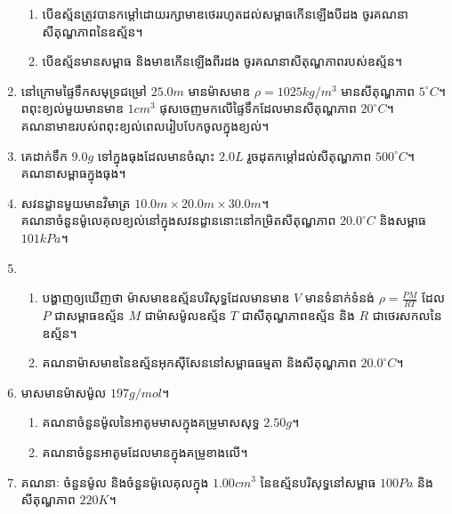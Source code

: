 \begin{enumerate}
	\begin{enumerate}[k]
		\item បើឧស្ម័នត្រូវបានកម្តៅដោយរក្សាមាឌថេររហូតដល់សម្ពាធកើនឡើងបីដង ចូរគណនាសីតុណ្ហភាពនៃឧស្ម័ន។
		\item បើឧស្ម័នមានសម្ពាធ និងមាឌកើនឡើងពីរដង ចូរគណនាសីតុណ្ហភាពរបស់ឧស្ម័ន។
	\end{enumerate}
	\item នៅក្រោមផ្ទៃទឹកសមុទ្រជម្រៅ $25.0m$ មានម៉ាសមាឌ $\rho=1025kg/m^{3}$ មានសីតុណ្ហភាព $5^\circ C$។ ពពុះខ្យល់មួយមានមាឌ $1cm^{3}$ ផុសចេញមកលើផ្ទៃទឹកដែលមានសីតុណ្ហភាព $20^\circ C$។\\ គណនាមាឌរបស់ពពុះខ្យល់ពេលរៀបបែកចូលក្នុងខ្យល់។
	\item គេដាក់ទឹក $9.0g$ ទៅក្នុងធុងដែលមានចំណុះ $2.0L$ រួចដុតកម្តៅដល់សីតុណ្ហភាព $500^\circ C$។ គណនាសម្ពាធក្នុងធុង។
	\item សវនដ្ខានមួយមានវិមាត្រ $10.0m\times20.0m\times30.0m$។\\ គណនាចំនួនម៉ូលេគុលខ្យល់នៅក្នុងសវនដ្ខាននោះនៅកម្រិតសីតុណ្ហភាព $20.0^\circ C$ និងសម្ពាធ $101kPa$។
	\item \begin{enumerate}[k]
		\item បង្ហាញឲ្យឃើញថា ម៉ាសមាឌឧស្ម័នបរិសុទ្ធដែលមានមាឌ $V$ មានទំនាក់ទំនង់ $\rho =\frac{PM}{RT}$ ដែល $P$ ជាសម្ពាធឧស្ម័ន $M$ ជាម៉ាសម៉ូលឧស្ម័ន $T$ ជាសីតុណ្ហភាពឧស្ម័ន និង $R$ ជាថេរសកលនៃឧស្ម័ន។
		\item គណនាម៉ាសមាឌនៃឧស្ម័នអុកសុីសែននៅសម្ពាធធម្មតា និងសីតុណ្ហភាព $20.0^\circ C$។
	\end{enumerate}
	\item មាសមានម៉ាសម៉ូល $197g/mol$។
	\begin{enumerate}[k]
		\item គណនាចំនួនម៉ូលនៃអាតូមមាសក្នុងគម្រូមាសសុទ្ធ $2.50g$។
		\item គណនាចំនួនអាតូមដែលមានក្នុងគម្រូខាងលើ។
	\end{enumerate}
	\item គណនាៈ ចំនួនម៉ូល និងចំនួនម៉ូលេគុលក្នុង $1.00cm^{3}$ នៃឧស្ម័នបរិសុទ្ធនៅសម្ពាធ $100Pa$ និងសីតុណ្ហភាព $220K$។
\end{enumerate}
